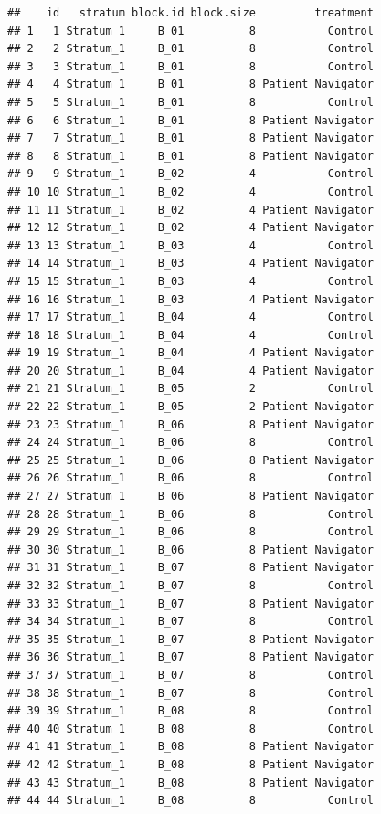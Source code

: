 \documentclass[
]{book}
\begin{document}
\begin{verbatim}
##    id   stratum block.id block.size         treatment
## 1   1 Stratum_1     B_01          8           Control
## 2   2 Stratum_1     B_01          8           Control
## 3   3 Stratum_1     B_01          8           Control
## 4   4 Stratum_1     B_01          8 Patient Navigator
## 5   5 Stratum_1     B_01          8           Control
## 6   6 Stratum_1     B_01          8 Patient Navigator
## 7   7 Stratum_1     B_01          8 Patient Navigator
## 8   8 Stratum_1     B_01          8 Patient Navigator
## 9   9 Stratum_1     B_02          4           Control
## 10 10 Stratum_1     B_02          4           Control
## 11 11 Stratum_1     B_02          4 Patient Navigator
## 12 12 Stratum_1     B_02          4 Patient Navigator
## 13 13 Stratum_1     B_03          4           Control
## 14 14 Stratum_1     B_03          4 Patient Navigator
## 15 15 Stratum_1     B_03          4           Control
## 16 16 Stratum_1     B_03          4 Patient Navigator
## 17 17 Stratum_1     B_04          4           Control
## 18 18 Stratum_1     B_04          4           Control
## 19 19 Stratum_1     B_04          4 Patient Navigator
## 20 20 Stratum_1     B_04          4 Patient Navigator
## 21 21 Stratum_1     B_05          2           Control
## 22 22 Stratum_1     B_05          2 Patient Navigator
## 23 23 Stratum_1     B_06          8 Patient Navigator
## 24 24 Stratum_1     B_06          8           Control
## 25 25 Stratum_1     B_06          8 Patient Navigator
## 26 26 Stratum_1     B_06          8           Control
## 27 27 Stratum_1     B_06          8 Patient Navigator
## 28 28 Stratum_1     B_06          8           Control
## 29 29 Stratum_1     B_06          8           Control
## 30 30 Stratum_1     B_06          8 Patient Navigator
## 31 31 Stratum_1     B_07          8 Patient Navigator
## 32 32 Stratum_1     B_07          8           Control
## 33 33 Stratum_1     B_07          8 Patient Navigator
## 34 34 Stratum_1     B_07          8           Control
## 35 35 Stratum_1     B_07          8 Patient Navigator
## 36 36 Stratum_1     B_07          8 Patient Navigator
## 37 37 Stratum_1     B_07          8           Control
## 38 38 Stratum_1     B_07          8           Control
## 39 39 Stratum_1     B_08          8           Control
## 40 40 Stratum_1     B_08          8           Control
## 41 41 Stratum_1     B_08          8 Patient Navigator
## 42 42 Stratum_1     B_08          8 Patient Navigator
## 43 43 Stratum_1     B_08          8 Patient Navigator
## 44 44 Stratum_1     B_08          8           Control

\end{verbatim}
\end{document}
